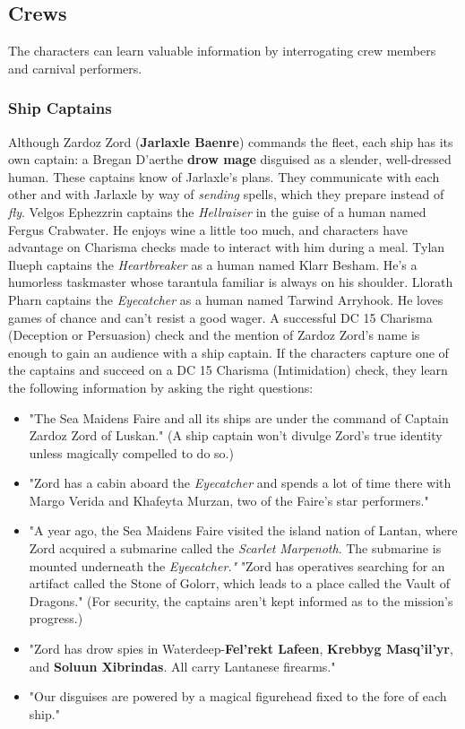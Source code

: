 \documentclass[10pt,a4paper,twoside,twocolumn,openany,nodeprecatedcode]{dndbook}
\begin{document}
\subsection{Crews}
The characters can learn valuable information by interrogating crew members and carnival performers.
\subsubsection{Ship Captains}
Although Zardoz Zord (\textbf{Jarlaxle Baenre}) commands the fleet, each ship has its own captain: a Bregan D'aerthe \textbf{drow mage} disguised as a slender, well-dressed human. These captains know of Jarlaxle's plans. They communicate with each other and with Jarlaxle by way of \textit{sending} spells, which they prepare instead of \textit{fly}.
Velgos Ephezzrin captains the \textit{Hellraiser} in the guise of a human named Fergus Crabwater. He enjoys wine a little too much, and characters have advantage on Charisma checks made to interact with him during a meal.
Tylan Ilueph captains the \textit{Heartbreaker} as a human named Klarr Besham. He's a humorless taskmaster whose tarantula familiar is always on his shoulder.
Llorath Pharn captains the \textit{Eyecatcher} as a human named Tarwind Arryhook. He loves games of chance and can't resist a good wager.
A successful DC 15 Charisma (Deception or Persuasion) check and the mention of Zardoz Zord's name is enough to gain an audience with a ship captain.
If the characters capture one of the captains and succeed on a DC 15 Charisma (Intimidation) check, they learn the following information by asking the right questions:
\begin{itemize}

\item "The Sea Maidens Faire and all its ships are under the command of Captain Zardoz Zord of Luskan." (A ship captain won't divulge Zord's true identity unless magically compelled to do so.)
\item "Zord has a cabin aboard the \textit{Eyecatcher} and spends a lot of time there with Margo Verida and Khafeyta Murzan, two of the Faire's star performers."
\item "A year ago, the Sea Maidens Faire visited the island nation of Lantan, where Zord acquired a submarine called the \textit{Scarlet Marpenoth}. The submarine is mounted underneath the \textit{Eyecatcher."} "Zord has operatives searching for an artifact called the Stone of Golorr, which leads to a place called the Vault of Dragons." (For security, the captains aren't kept informed as to the mission's progress.)
\item "Zord has drow spies in Waterdeep-\textbf{Fel'rekt Lafeen}, \textbf{Krebbyg Masq'il'yr}, and \textbf{Soluun Xibrindas}. All carry Lantanese firearms."
\item "Our disguises are powered by a magical figurehead fixed to the fore of each ship."
\end{itemize}
\end{document}
